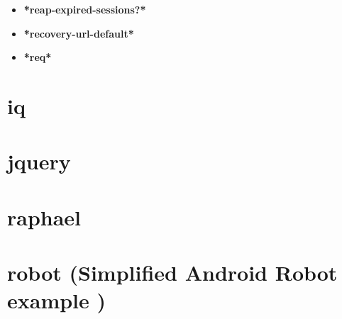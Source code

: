 \documentclass [11pt]{book}
\begin{document}
\begin{itemize}
\item {}
\label{prim:*reap-expired-sessions?*}
\textbf{*reap-expired-sessions?*}





\item {}
\label{prim:*recovery-url-default*}
\textbf{*recovery-url-default*}





\item {}
\label{prim:*req*}
\textbf{*req*}





\end{itemize}





\section{iq }

\label{sec:iq}







\section{jquery }

\label{sec:jquery}







\section{raphael }

\label{sec:raphael}







\section{robot (Simplified Android Robot example )}

\label{sec:robot(simplifiedandroidrobotexample)}
\end{document}
